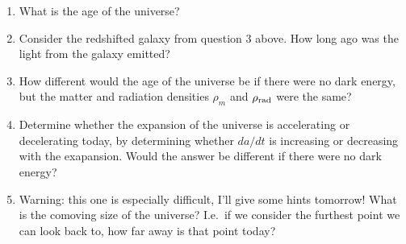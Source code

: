 \documentclass[aps,prd,superscriptaddress,groupedaddress,nofootinbib,nobibnotes]{revtex4}
\begin{document}
\begin{enumerate}[resume]
\item What is the age of the universe?
\item Consider the redshifted galaxy from question 3 above.  How long ago was the
  light from the galaxy emitted?
\item How different would the age of the universe be if there were no dark energy, but
   the matter and radiation densities $\rho_m$ and $\rho_{\rm rad}$ were the same?
\item Determine whether the expansion of the universe is accelerating or decelerating today,
  by determining whether $da/dt$ is increasing or decreasing with the exapansion.  Would
  the answer be different if there were no dark energy?
\item Warning: this one is especially difficult, I'll give some hints tomorrow!
  What is the comoving size of the universe?  I.e.~if we consider the furthest point we
  can look back to, how far away is that point today?
\end{enumerate}


%

% 
% 

\end{document}
